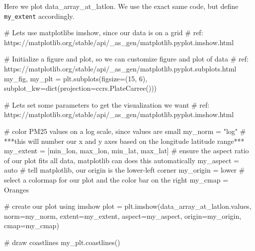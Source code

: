\documentclass[
  letterpaper,
  DIV=11,
  numbers=noendperiod]{scrreprt}
\newenvironment{Shaded}{\begin{snugshade}}{\end{snugshade}}
\newcommand{\BuiltInTok}[1]{\textcolor[rgb]{0.00,0.23,0.31}{#1}}
\newcommand{\CommentTok}[1]{\textcolor[rgb]{0.37,0.37,0.37}{#1}}
\newcommand{\DecValTok}[1]{\textcolor[rgb]{0.68,0.00,0.00}{#1}}
\newcommand{\NormalTok}[1]{\textcolor[rgb]{0.00,0.23,0.31}{#1}}
\newcommand{\OperatorTok}[1]{\textcolor[rgb]{0.37,0.37,0.37}{#1}}
\newcommand{\StringTok}[1]{\textcolor[rgb]{0.13,0.47,0.30}{#1}}
\begin{document}
Here we plot data\_array\_at\_latlon. We use the exact same code, but
define \texttt{my\_extent} accordingly.

\begin{Shaded}
\begin{Highlighting}[]
\CommentTok{\# Let\textquotesingle{}s use matplotlib\textquotesingle{}s imshow, since our data is on a grid}
\CommentTok{\# ref: https://matplotlib.org/stable/api/\_as\_gen/matplotlib.pyplot.imshow.html}

\CommentTok{\# Initialize a figure and plot, so we can customize figure and plot of data}
\CommentTok{\# ref: https://matplotlib.org/stable/api/\_as\_gen/matplotlib.pyplot.subplots.html}
\NormalTok{my\_fig, my\_plt }\OperatorTok{=}\NormalTok{ plt.subplots(figsize}\OperatorTok{=}\NormalTok{(}\DecValTok{15}\NormalTok{, }\DecValTok{6}\NormalTok{), subplot\_kw}\OperatorTok{=}\BuiltInTok{dict}\NormalTok{(projection}\OperatorTok{=}\NormalTok{ccrs.PlateCarree()))}

\CommentTok{\# Let\textquotesingle{}s set some parameters to get the visualization we want}
\CommentTok{\# ref: https://matplotlib.org/stable/api/\_as\_gen/matplotlib.pyplot.imshow.html}

\CommentTok{\# color PM25 values on a log scale, since values are small}
\NormalTok{my\_norm }\OperatorTok{=} \StringTok{"log"} 
\CommentTok{\# ***this will number our x and y axes based on the longitude latitude range***}
\NormalTok{my\_extent }\OperatorTok{=}\NormalTok{ [min\_lon, max\_lon, min\_lat, max\_lat]}
\CommentTok{\# ensure the aspect ratio of our plot fits all data, matplotlib can does this automatically}
\NormalTok{my\_aspect }\OperatorTok{=} \StringTok{\textquotesingle{}auto\textquotesingle{}}
\CommentTok{\# tell matplotlib, our origin is the lower{-}left corner}
\NormalTok{my\_origin }\OperatorTok{=} \StringTok{\textquotesingle{}lower\textquotesingle{}}
\CommentTok{\# select a colormap for our plot and the color bar on the right}
\NormalTok{my\_cmap }\OperatorTok{=} \StringTok{\textquotesingle{}Oranges\textquotesingle{}}

\CommentTok{\# create our plot using imshow}
\NormalTok{plot }\OperatorTok{=}\NormalTok{ plt.imshow(data\_array\_at\_latlon.values, norm}\OperatorTok{=}\NormalTok{my\_norm, extent}\OperatorTok{=}\NormalTok{my\_extent, }
\NormalTok{          aspect}\OperatorTok{=}\NormalTok{my\_aspect, origin}\OperatorTok{=}\NormalTok{my\_origin, cmap}\OperatorTok{=}\NormalTok{my\_cmap)}

\CommentTok{\# draw coastlines}
\NormalTok{my\_plt.coastlines()}


\end{Highlighting}
\end{Shaded}
\end{document}
